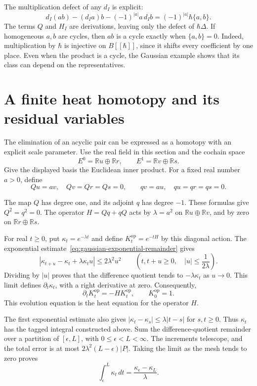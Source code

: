 The multiplication defect of any $d_I$ is explicit:
\begin{equation}\label{eq:gaussian-observable-product}
 d_I(ab)-(d_Ia)b-(-1)^{|a|}a\,d_Ib
 =(-1)^{|a|}\hbar\{a,b\}.
\end{equation}
The terms $Q$ and $H_I$ are derivations, leaving only the defect of
$\hbar\Delta$.
If homogeneous $a,b$ are cycles, then $ab$ is a cycle exactly when
$\{a,b\}=0$.
Indeed, multiplication by $\hbar$ is injective on $B[[\hbar]]$, since
it shifts every coefficient by one place.
Even when the product is a cycle, the Gaussian example shows that its
class can depend on the representatives.

\section{A finite heat homotopy and its residual variables}
\label{sec:gaussian-heat}

The elimination of an acyclic pair can be expressed as a homotopy with
an explicit scale parameter.
Use the real field in this section and the cochain space
\[
 E^0=\mathbb R u\oplus\mathbb R r,
 \qquad E^1=\mathbb R v\oplus\mathbb R s.
\]
Give the displayed basis the Euclidean inner product.
For a fixed real number $a>0$, define
\[
 Qu=av,\quad Qv=Qr=Qs=0,
 \qquad qv=au,\quad qu=qr=qs=0.
\]

The map $Q$ has degree one, and its adjoint $q$ has degree $-1$.
These formulas give $Q^2=q^2=0$.
The operator $H=Qq+qQ$ acts by $\lambda=a^2$ on
$\mathbb R u\oplus\mathbb R v$, and by zero on
$\mathbb R r\oplus\mathbb R s$.

For real $t\geq0$, put $\kappa_t=e^{-\lambda t}$ and define
$K_t^{\mathrm{op}}=e^{-tH}$ by this diagonal action.
The exponential estimate~\eqref{eq:gaussian-exponential-remainder} gives
\[
 |\kappa_{t+u}-\kappa_t+\lambda\kappa_tu|
 \leq2\lambda^2u^2
 \qquad\left(t,t+u\geq0,\quad |u|\leq\frac1{2\lambda}\right).
\]
Dividing by $|u|$ proves that the difference quotient tends to
$-\lambda\kappa_t$ as $u\to0$.
This limit defines $\partial_t\kappa_t$, with a right derivative at zero.
Consequently,
\[
 \partial_tK_t^{\mathrm{op}}=-HK_t^{\mathrm{op}},
 \qquad K_0^{\mathrm{op}}=1.
\]
This evolution equation is the heat equation for the operator $H$.

The first exponential estimate also gives
$|\kappa_t-\kappa_s|\leq\lambda|t-s|$ for $s,t\geq0$.
Thus $\kappa_t$ has the tagged integral constructed above.
Sum the difference-quotient remainder over a partition of
$[\epsilon,L]$, with $0\leq\epsilon<L<\infty$.
The increments telescope, and the total error is at most
$2\lambda^2(L-\epsilon)|P|$.
Taking the limit as the mesh tends to zero proves
\[
 \int_\epsilon^L\kappa_t\,dt
 =\frac{\kappa_\epsilon-\kappa_L}{\lambda}.
\]

